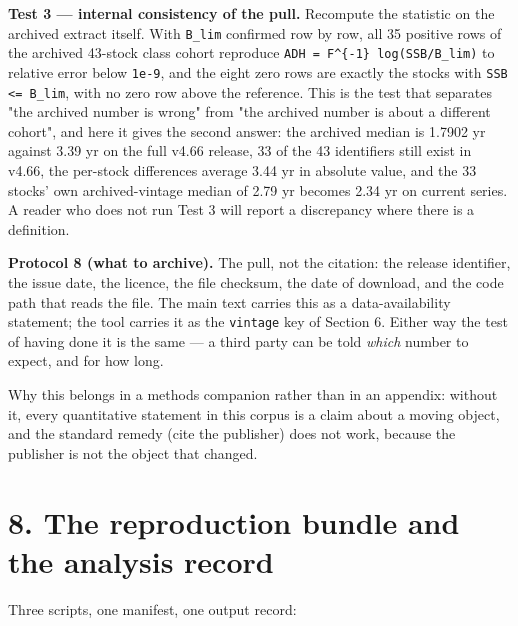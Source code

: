 \documentclass[11pt]{article}
\begin{document}
\textbf{Test 3 --- internal consistency of the pull.} Recompute the statistic on the archived extract itself. With \texttt{B\_lim} confirmed row by row, all 35 positive rows of the archived 43-stock class cohort reproduce \texttt{ADH = F\textasciicircum{}\{-1\} log(SSB/B\_lim)} to relative error below \texttt{1e-9}, and the eight zero rows are exactly the stocks with \texttt{SSB <= B\_lim}, with no zero row above the reference. This is the test that separates "the archived number is wrong" from "the archived number is about a different cohort", and here it gives the second answer: the archived median is 1.7902 yr against 3.39 yr on the full v4.66 release, 33 of the 43 identifiers still exist in v4.66, the per-stock differences average 3.44 yr in absolute value, and the 33 stocks' own archived-vintage median of 2.79 yr becomes 2.34 yr on current series. A reader who does not run Test 3 will report a discrepancy where there is a definition.

\textbf{Protocol 8 (what to archive).} The pull, not the citation: the release identifier, the issue date, the licence, the file checksum, the date of download, and the code path that reads the file. The main text carries this as a data-availability statement; the tool carries it as the \texttt{vintage} key of Section 6. Either way the test of having done it is the same --- a third party can be told \emph{which} number to expect, and for how long.

Why this belongs in a methods companion rather than in an appendix: without it, every quantitative statement in this corpus is a claim about a moving object, and the standard remedy (cite the publisher) does not work, because the publisher is not the object that changed.

\vspace{0.8em}

\section*{8. The reproduction bundle and the analysis record}\label{8-the-reproduction-bundle-and-the-analysis-record}

Three scripts, one manifest, one output record:
\end{document}
